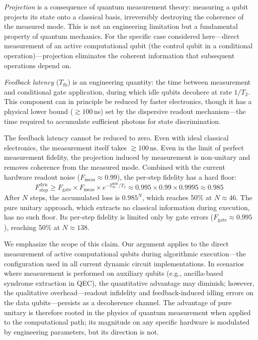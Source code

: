 \documentclass[11pt]{article}
\begin{document}
\emph{Projection} is a consequence of quantum measurement theory: measuring a qubit projects its state onto a classical basis, irreversibly destroying the coherence of the measured mode.
This is not an engineering limitation but a fundamental property of quantum mechanics.
For the specific case considered here---direct measurement of an active computational qubit (the control qubit in a conditional operation)---projection eliminates the coherent information that subsequent operations depend on.

\emph{Feedback latency} ($T_\text{fb}$) is an engineering quantity: the time between measurement and conditional gate application, during which idle qubits decohere at rate $1/T_2$.
This component can in principle be reduced by faster electronics, though it has a physical lower bound ($\gtrsim 100\,$ns) set by the dispersive readout mechanism---the time required to accumulate sufficient photons for state discrimination.

The feedback latency cannot be reduced to zero.
Even with ideal classical electronics, the measurement itself takes $\gtrsim 100\,$ns.
Even in the limit of perfect measurement fidelity, the projection induced by measurement is non-unitary and removes coherence from the measured mode.
Combined with the current hardware readout noise ($F_\text{meas} \approx 0.99$), the per-step fidelity has a hard floor:
\begin{equation}
F_\text{step}^\text{dyn} \geq F_\text{gate} \times F_\text{meas} \times e^{-T_\text{fb}^\text{min}/T_2} \approx 0.995 \times 0.99 \times 0.9995 \approx 0.985
\end{equation}
After $N$ steps, the accumulated loss is $0.985^N$, which reaches 50\% at $N \approx 46$.
The pure unitary approach, which extracts no classical information during execution, has no such floor.
Its per-step fidelity is limited only by gate errors ($F_\text{gate} \approx 0.995$), reaching 50\% at $N \approx 138$.

We emphasize the scope of this claim.
Our argument applies to the direct measurement of active computational qubits during algorithmic execution---the configuration used in all current dynamic circuit implementations.
In scenarios where measurement is performed on auxiliary qubits (e.g., ancilla-based syndrome extraction in QEC), the quantitative advantage may diminish; however, the qualitative overhead---readout infidelity and feedback-induced idling errors on the data qubits---persists as a decoherence channel.
The advantage of pure unitary is therefore rooted in the physics of quantum measurement when applied to the computational path; its magnitude on any specific hardware is modulated by engineering parameters, but its direction is not.
\end{document}
